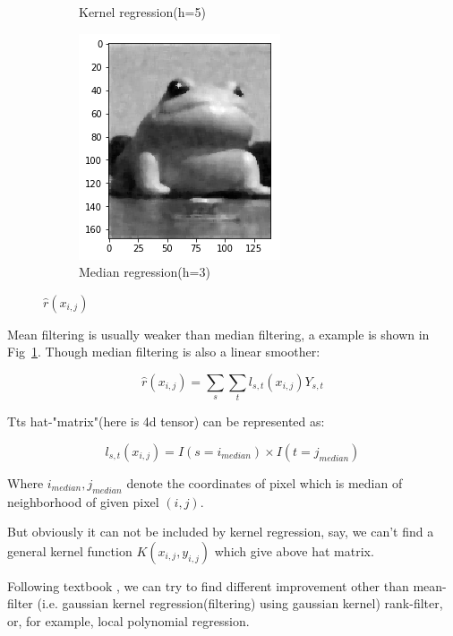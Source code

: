 \documentclass{beamer}
\begin{document}
\begin{frame}
\begin{figure}[htb]
\begin{subfigure}[b]{0.24\linewidth}
      \caption{Kernel regression(h=5)}
    \end{subfigure}
    \begin{subfigure}[b]{0.24\linewidth}
      \includegraphics[width=\linewidth]{images/noise_removal_4.png}
      \caption{Median regression(h=3)}
    \end{subfigure}
    \caption{$\hat{r}(x_{i,j})$}
    \label{fig:effect_noise_removal}
  \end{figure}  

\end{frame}

\begin{frame}
  Mean filtering is usually weaker than median filtering, a example is shown in Fig~\ref{fig:effect_noise_removal}. 
Though median filtering is also a linear smoother: 

$$
\hat{r}(x_{i,j})=\sum_s \sum_t l_{s,t}(x_{i,j})Y_{s,t}$$

Tts hat-"matrix"(here is 4d tensor) can be represented as: 

$$ 
l_{s,t}(x_{i,j}) = I(s=i_{median}) \times I(t=j_{median}) 
$$

Where $i_{median},j_{median}$ denote the coordinates of pixel which is median of neighborhood of given pixel $(i,j)$.

But obviously it can not be included by kernel regression, say, 
we can't find a general kernel function $K(x_{i,j},y_{i,j})$ which give above hat matrix. 

Following textbook \cite{wasserman2006all}, we can try to find different improvement other than mean-filter 
(i.e. gaussian kernel regression(filtering) using gaussian kernel) rank-filter, or, 
for example, local polynomial regression. 

\end{frame}
\end{document}
